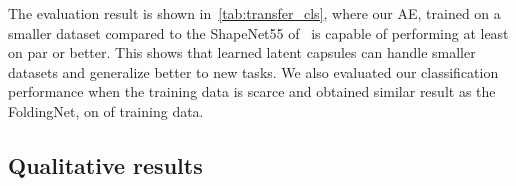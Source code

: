 \documentclass[10pt,twocolumn,letterpaper]{article}
\theoremstyle{break}
\begin{document}
The evaluation result is shown in~\cref{tab:transfer_cls}, where our AE, trained on a smaller dataset compared to the ShapeNet55 of~\cite{achlioptas2017latent_pc,Yang_2018_CVPR} is capable of performing at least on par or better. This shows that learned latent capsules can handle smaller datasets and generalize better to new tasks. We also evaluated our classification performance when the training data is scarce and obtained similar result as the FoldingNet,  on  of training data.
\begin{table}[t!]
  \centering
  \caption{Part segmentation on ShapeNet-Part by learning only on the  of the  training data.}
  \vspace{1pt}
  \vspace{-3mm}
\end{table}%
\subsection{Qualitative results}
\end{document}
